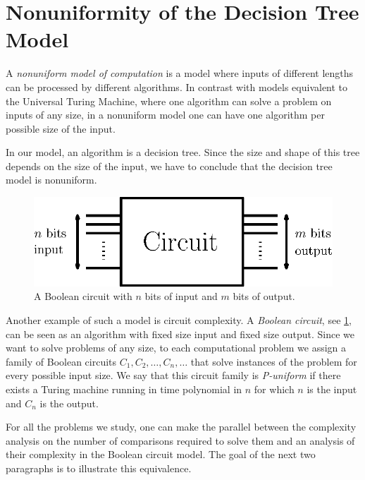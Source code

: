 \section{Nonuniformity of the Decision Tree Model}
\label{tree:sorting:nonuniformity}

A \emph{nonuniform model of computation} is a model where inputs of different lengths
can be processed by different algorithms. In contrast with models equivalent to
the Universal Turing Machine, where one algorithm can solve a problem on inputs
of any size, in a nonuniform model one can have one algorithm per possible size
of the input.

In our model, an algorithm is a decision tree. Since the size and shape of
this tree depends on the size of the input, we have to conclude that the
decision tree model is nonuniform.

\begin{figure}
\center
\includegraphics[height=0.12\textheight]{fig/sorting/model/circuit}
\caption{A Boolean circuit with \(n\) bits of input and \(m\) bits of output.}
\label{fig:sorting:nonuniformity:circuit}
\end{figure}

Another example of such a model is circuit complexity. A \emph{Boolean circuit},
see \ref{fig:sorting:nonuniformity:circuit}, can be seen as an algorithm with
fixed size input and fixed size output. Since we want to solve problems of any
size, to each computational problem we assign a family of Boolean circuits
\(C_1,C_2,\ldots,C_n,\ldots\) that solve instances of the problem for every
possible input size. We say that this circuit family is \emph{P-uniform} if there
exists a Turing machine running in time polynomial in \(n\) for which \(n\) is
the input and \(C_n\) is the output.

For all the problems we study, one can make the parallel between the
complexity analysis on the number of comparisons required to solve them and an
analysis of their complexity in the Boolean circuit model. The goal of the
next two paragraphs is to illustrate this equivalence.

